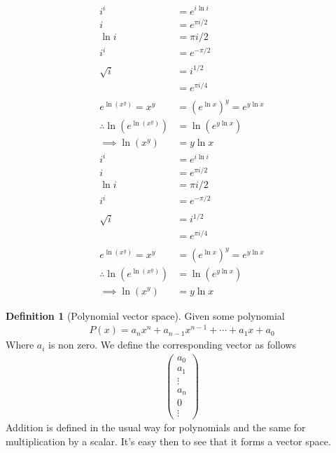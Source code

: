 \documentclass[a4paper,11pt]{article}
\theoremstyle{plain}
\theoremstyle{definition}
\newtheorem{definition}[theorem]{Definition}
\begin{document}
\begin{align*}
	i^i&=e^{i\ln i}\\
	i&=e^{\pi i/2}\\
	\ln i&=\pi i/2\\
	i^i&=e^{-\pi/2}\\
	\\
	\sqrt{i}&=i^{1/2}\\
			&=e^{\pi i/4}\\
	\\
	e^{\ln\left(x^y\right)}=x^y&={\left(e^{\ln x}\right)}^y=e^{y\ln x}\\
	\therefore \ln\left(e^{\ln\left(x^y\right)}\right)
	&=\ln\left(e^{y\ln x}\right)\\
	\implies \ln\left(x^y\right)&=y\ln x
\end{align*}
\begin{align*}
	i^i&=e^{i\ln i}\\
	i&=e^{\pi i/2}\\
	\ln i&=\pi i/2\\
	i^i&=e^{-\pi/2}\\
	\\
	\sqrt{i}&=i^{1/2}\\
			&=e^{\pi i/4}\\
	\\
	e^{\ln\left(x^y\right)}=x^y&={\left(e^{\ln x}\right)}^y=e^{y\ln x}\\
	\therefore \ln\left(e^{\ln\left(x^y\right)}\right)
	&=\ln\left(e^{y\ln x}\right)\\
	\implies \ln\left(x^y\right)&=y\ln x
\end{align*}
\begin{definition}[Polynomial vector space]
	Given some polynomial 
	\begin{equation}
	\begin{aligned}	
		P(x) = a_n x^n+a_{n-1} x^{n-1}+\cdots+a_1x+a_0
	\end{aligned}	
	\end{equation}
	Where $a_i$ is non zero. We define the corresponding vector as follows
	\begin{equation}
	\begin{aligned}	
		\begin{pmatrix}
			a_0 \\
			a_1 \\
			\vdots \\
			a_n \\
			0 \\
			\vdots
		\end{pmatrix}
	\end{aligned}	
	\end{equation}
	Addition is defined in the usual way for polynomials and the same for
	multiplication by a scalar. It's easy then to see that it forms a vector
	space.
\end{definition}
\end{document}
